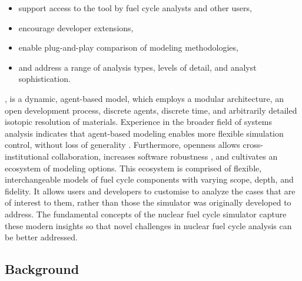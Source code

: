 \begin{itemize}
\item support access to the tool by fuel cycle analysts and other users,
\item encourage developer extensions,
\item enable plug-and-play comparison of modeling methodologies,
\item and address a range of analysis types, levels of detail, and analyst sophistication.
\end{itemize}

\Cyclus, is a dynamic, agent-based model, which employs a modular architecture,
an open development process, discrete agents, discrete time, and arbitrarily
detailed isotopic resolution of materials. Experience in the broader field of
systems analysis indicates that agent-based modeling enables more flexible
simulation control, without loss of generality
\cite{macal_agent-based_2010}. Furthermore, openness allows cross-institutional
collaboration, increases software robustness \cite{cohen_modern_2010}, and
cultivates an ecosystem of modeling options. This ecosystem is
comprised of flexible, interchangeable models of fuel cycle components with
varying scope, depth, and fidelity. It allows users and developers to customise
\Cyclus to analyze the cases that are of interest to them, rather than those the
simulator was originally developed to address.  The fundamental concepts of the
\Cyclus nuclear fuel cycle simulator capture these modern insights so that novel
challenges in nuclear fuel cycle analysis can be better addressed.

\subsection{Background}




